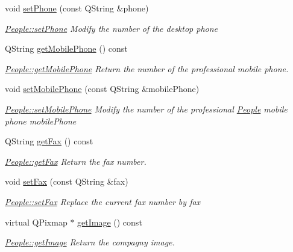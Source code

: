 \begin{DoxyCompactItemize}
void \hyperlink{classModels_1_1People_adea0f24c3438d7c65a6df522e3253863}{set\-Phone} (const Q\-String \&phone)
\begin{DoxyCompactList}\small\item\em \hyperlink{classModels_1_1People_adea0f24c3438d7c65a6df522e3253863}{People\-::set\-Phone} Modify the number of the desktop {\itshape phone} \end{DoxyCompactList}\item 
Q\-String \hyperlink{classModels_1_1People_aaf8d6ac89ea0ae0a1064503f3b9b6dbb}{get\-Mobile\-Phone} () const 
\begin{DoxyCompactList}\small\item\em \hyperlink{classModels_1_1People_aaf8d6ac89ea0ae0a1064503f3b9b6dbb}{People\-::get\-Mobile\-Phone} Return the number of the professional mobile phone. \end{DoxyCompactList}\item 
void \hyperlink{classModels_1_1People_a38e71d8991c2ef70f4f3f4b864913a58}{set\-Mobile\-Phone} (const Q\-String \&mobile\-Phone)
\begin{DoxyCompactList}\small\item\em \hyperlink{classModels_1_1People_a38e71d8991c2ef70f4f3f4b864913a58}{People\-::set\-Mobile\-Phone} Modify the number of the professional \hyperlink{classModels_1_1People}{People} mobile phone {\itshape mobile\-Phone} \end{DoxyCompactList}\item 
Q\-String \hyperlink{classModels_1_1People_a30b8378d221c9f20a66797a526973be9}{get\-Fax} () const 
\begin{DoxyCompactList}\small\item\em \hyperlink{classModels_1_1People_a30b8378d221c9f20a66797a526973be9}{People\-::get\-Fax} Return the fax number. \end{DoxyCompactList}\item 
void \hyperlink{classModels_1_1People_adaa1a83318fd0a251cbcc4a93dc01096}{set\-Fax} (const Q\-String \&fax)
\begin{DoxyCompactList}\small\item\em \hyperlink{classModels_1_1People_adaa1a83318fd0a251cbcc4a93dc01096}{People\-::set\-Fax} Replace the current fax number by {\itshape fax} \end{DoxyCompactList}\item 
virtual Q\-Pixmap $\ast$ \hyperlink{classModels_1_1People_a4bed6596966747975ba9a41b856cc1dc}{get\-Image} () const 
\begin{DoxyCompactList}\small\item\em \hyperlink{classModels_1_1People_a4bed6596966747975ba9a41b856cc1dc}{People\-::get\-Image} Return the compagny image. \end{DoxyCompactList}\item 

\end{DoxyCompactItemize}
